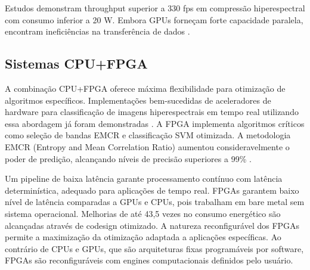 Estudos demonstram throughput superior a 330 fps em compressão hiperespectral
com consumo inferior a 20 W. Embora GPUs forneçam forte capacidade paralela,
encontram ineficiências na transferência de dados \cite{SahovicQuinten2025}.

\subsection{Sistemas CPU+FPGA}
\label{subsec:sistemas_cpu_fpga}

A combinação CPU+FPGA oferece máxima flexibilidade para otimização de algoritmos
específicos. Implementações bem-sucedidas de aceleradores de hardware para
classificação de imagens hiperespectrais em tempo real utilizando essa abordagem
já foram demonstradas \cite{Martins2019}. A FPGA implementa algoritmos críticos
como seleção de bandas EMCR e classificação SVM otimizada. A metodologia EMCR
(Entropy and Mean Correlation Ratio) aumentou consideravelmente o poder de
predição, alcançando níveis de precisão superiores a 99\% \cite{Martins2019}.

Um pipeline de baixa latência garante processamento contínuo com latência
determinística, adequado para aplicações de tempo real. FPGAs garantem baixo
nível de latência comparadas a GPUs e CPUs, pois trabalham em bare metal sem
sistema operacional. Melhorias de até 43,5 vezes no consumo energético são
alcançadas através de codesign otimizado. A natureza reconfigurável dos FPGAs
permite a maximização da otimização adaptada a aplicações específicas. Ao
contrário de CPUs e GPUs, que são arquiteturas fixas programáveis por software,
FPGAs são reconfiguráveis com engines computacionais definidos pelo usuário.
